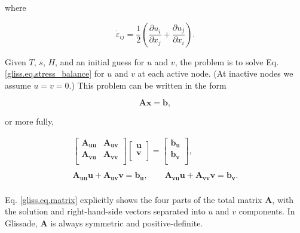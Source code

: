 \noindent
where

\begin{equation}
  \dot{\varepsilon }_{ij} = \frac{1}{2}\left( \frac{\partial u_{i}}{\partial x_{j}} + \frac{\partial u_{j}}{\partial x_{i}} \right).
\end{equation}

\noindent

Given $T$, $s$, $H$, and an initial guess for $u$ and $v$, the problem is to solve Eq. \eqref{gliss.eq.stress_balance}
for $u$ and $v$ at each active node.  (At inactive nodes we assume $u=v=0$.)  This problem can be written in the form

\begin{equation}
  \mathbf{A} \mathbf{x} = \mathbf{b},
\end{equation}

\noindent
or more fully,

\begin{equation}
  \label{gliss.eq.matrix}
  \begin{matrix}
    \left[ \begin{matrix}
        \mathbf{A}_{\mathbf{uu}} & \mathbf{A}_{\mathbf{uv}}  \\
        \mathbf{A}_{\mathbf{vu}} & \mathbf{A}_{\mathbf{vv}}  \\
      \end{matrix} \right]\left[ \begin{matrix}
        \mathbf{u}  \\
        \mathbf{v}  \\
      \end{matrix} \right]=\left[ \begin{matrix}
        \mathbf{b}_{\mathbf{u}}  \\
        \mathbf{b}_{\mathbf{v}}  \\
      \end{matrix} \right], \\ 
    \\ 
    \mathbf{A}_{\mathbf{uu}}\mathbf{u} + \mathbf{A}_{\mathbf{uv}}\mathbf{v} =\mathbf{b}_{\mathbf{u}},
    \quad \quad \mathbf{A}_{\mathbf{vu}}\mathbf{u} + \mathbf{A}_{\mathbf{vv}}\mathbf{v} =\mathbf{b}_{\mathbf{v}}. \\ 
  \end{matrix}
\end{equation}

\noindent
Eq. \eqref{gliss.eq.matrix} explicitly shows the four parts of the total matrix $\mathbf{A}$,
with the solution and right-hand-side vectors separated into $u$ and $v$ components.
In Glissade, $\mathbf{A}$ is always symmetric and positive-definite.

